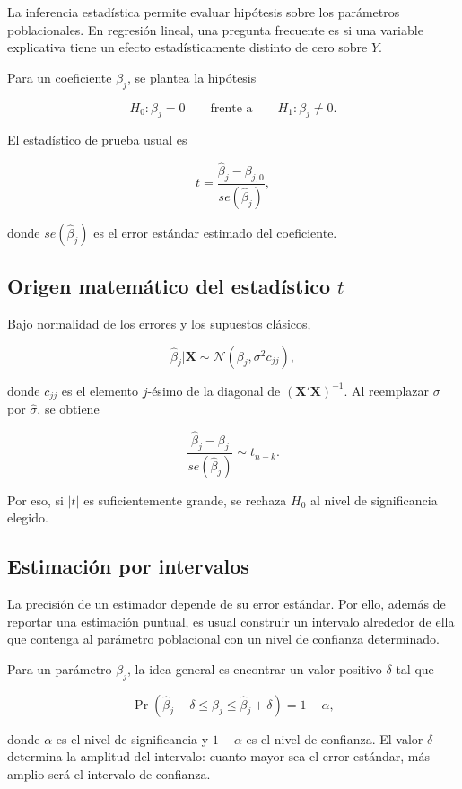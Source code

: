 \documentclass[11pt,a4paper]{article}
\begin{document}
La inferencia estadística permite evaluar hipótesis sobre los parámetros poblacionales. En regresión lineal, una pregunta frecuente es si una variable explicativa tiene un efecto estadísticamente distinto de cero sobre \(Y\).

Para un coeficiente \(\beta_j\), se plantea la hipótesis

\[
H_0: \beta_j = 0
\qquad \text{frente a} \qquad
H_1: \beta_j \neq 0.
\]

El estadístico de prueba usual es

\[
t = \frac{\hat{\beta}_j - \beta_{j,0}}{se(\hat{\beta}_j)},
\]

donde \(se(\hat{\beta}_j)\) es el error estándar estimado del coeficiente.

\subsection*{Origen matemático del estadístico \(t\)}

Bajo normalidad de los errores y los supuestos clásicos,

\[
\hat{\beta}_j|\mathbf{X}\sim\mathcal{N}\left(\beta_j,\sigma^2 c_{jj}\right),
\]

donde \(c_{jj}\) es el elemento \(j\)-ésimo de la diagonal de \((\mathbf{X}'\mathbf{X})^{-1}\). Al reemplazar \(\sigma\) por \(\hat{\sigma}\), se obtiene

\[
\frac{\hat{\beta}_j-\beta_j}{se(\hat{\beta}_j)}\sim t_{n-k}.
\]

Por eso, si \(|t|\) es suficientemente grande, se rechaza \(H_0\) al nivel de significancia elegido.

\subsection{Estimación por intervalos}

La precisión de un estimador depende de su error estándar. Por ello, además de reportar una estimación puntual, es usual construir un intervalo alrededor de ella que contenga al parámetro poblacional con un nivel de confianza determinado.

Para un parámetro \(\beta_j\), la idea general es encontrar un valor positivo \(\delta\) tal que

\[
\Pr\left(\hat{\beta}_j-\delta \leq \beta_j \leq \hat{\beta}_j+\delta\right)=1-\alpha,
\]

donde \(\alpha\) es el nivel de significancia y \(1-\alpha\) es el nivel de confianza. El valor \(\delta\) determina la amplitud del intervalo: cuanto mayor sea el error estándar, más amplio será el intervalo de confianza.
\end{document}
